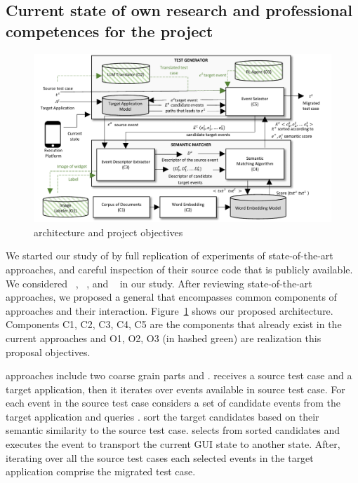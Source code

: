 	
\subsection{Current state of own research and professional competences for the project}
\label{sec:own-research}

\begin{figure}[h]
	\centering
	\includegraphics[width=\textwidth]{images/architecture.pdf}
	\caption{\testreuse architecture and project objectives}
	\label{fig:architecture}
\end{figure}

We started our study of \testreuse  by full replication of experiments of state-of-the-art  \testreuse approaches, and careful inspection of their source code that is publicly available. 
We considered \craftdroid~\cite{lin:craftdroid:ASE:2019}, \atm~\cite{behrang:apptestmigrator:ASE:2019}, and \adaptdroid~\cite{Mariani:Adaptdroid:AST:2021} in our study.
After reviewing state-of-the-art approaches, we proposed a general \architecture that encompasses common components of \testreuse approaches and their interaction. 
Figure~\ref{fig:architecture} shows our proposed architecture.
Components C1, C2, C3, C4, C5 are the components that already exist in the current approaches and O1, O2, O3 (in hashed green) are realization this proposal objectives. 

\bigskip
\testreuse approaches include two coarse grain parts \generator and \matcher.
\generator receives a source test case  and a target application, then it iterates over events available in source test case. 
For each event in the source test case \generator considers a set of candidate events from the target application and queries \matcher.
\matcher sort the target candidates based on their semantic similarity to the source test case.
\generator selects from sorted candidates and executes the event to transport the current GUI state to another state. 
After, iterating over all the source test cases each selected events in the target application comprise the migrated test case.

